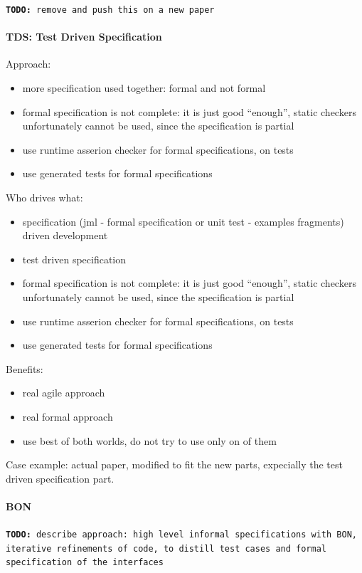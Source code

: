 \documentclass{article} \usepackage{times}
\newcommand{\todo}[1]{\texttt{\textbf{TODO:} #1}}
\begin{document}
\todo{remove and push this on a new paper}

\paragraph*{TDS: Test Driven Specification}

Approach:
\begin{itemize}
\item more specification used together: formal and not formal
\item formal specification is not complete: it is just good
  ``enough'', static checkers unfortunately cannot be used, since the
  specification is partial
\item use runtime asserion checker for formal specifications, on tests
\item use generated tests for formal specifications
\end{itemize}

Who drives what:
\begin{itemize}
\item specification (jml - formal specification or unit test -
  examples fragments) driven development
\item test driven specification
\item formal specification is not complete: it is just good
  ``enough'', static checkers unfortunately cannot be used, since the
  specification is partial
\item use runtime asserion checker for formal specifications, on tests
\item use generated tests for formal specifications
\end{itemize}

Benefits:
\begin{itemize}
\item real agile approach
\item real formal approach
\item use best of both worlds, do not try to use only on of them
\end{itemize}

Case example: actual paper, modified to fit the new parts, expecially
the test driven specification part.

\paragraph*{BON}

\todo{describe approach: high level informal specifications with BON,
  iterative refinements of code, to distill test cases and formal
  specification of the interfaces}
\end{document}
